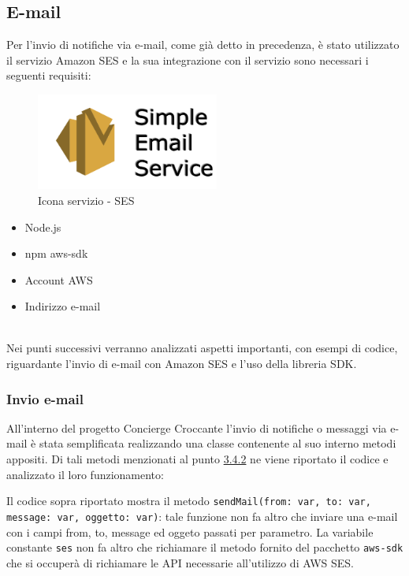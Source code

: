 \newpage
\subsection{E-mail}
Per l'invio di notifiche via e-mail, come già detto in precedenza, è stato utilizzato il servizio Amazon SES e la sua integrazione con il servizio sono necessari i seguenti requisiti:
\\
\begin{minipage}{0.47\textwidth}
	\begin{figure}[H]
		\includegraphics[width=6cm]{immagini/ses.png}
		\caption{\label{fig:google_calendar}Icona servizio - SES}
	\end{figure}
\end{minipage}
\begin{minipage}{0.5\textwidth}
	\begin{itemize}
		\item Node.js
		\item npm aws-sdk
		\item Account AWS
		\item Indirizzo e-mail
	\end{itemize}
\end{minipage}
\\[0.4cm]
Nei punti successivi verranno analizzati aspetti importanti, con esempi di codice, riguardante l'invio di e-mail con Amazon SES e l'uso della libreria SDK.

\subsubsection{Invio e-mail}
All'interno del progetto Concierge Croccante l'invio di notifiche o messaggi via e-mail è stata semplificata realizzando una classe contenente al suo interno metodi appositi. Di tali metodi menzionati al punto \hyperref[utils]{3.4.2} ne viene riportato il codice e analizzato il loro funzionamento: 


Il codice sopra riportato mostra il metodo \texttt{sendMail(from:  var, to:  var, message:  var, oggetto:  var)}: tale funzione non fa altro che inviare una e-mail con i campi from, to, message ed oggeto passati per parametro. La variabile constante \texttt{ses} non fa altro che richiamare il metodo fornito del pacchetto \texttt{aws-sdk} che si occuperà di richiamare le API necessarie all'utilizzo di AWS SES.

